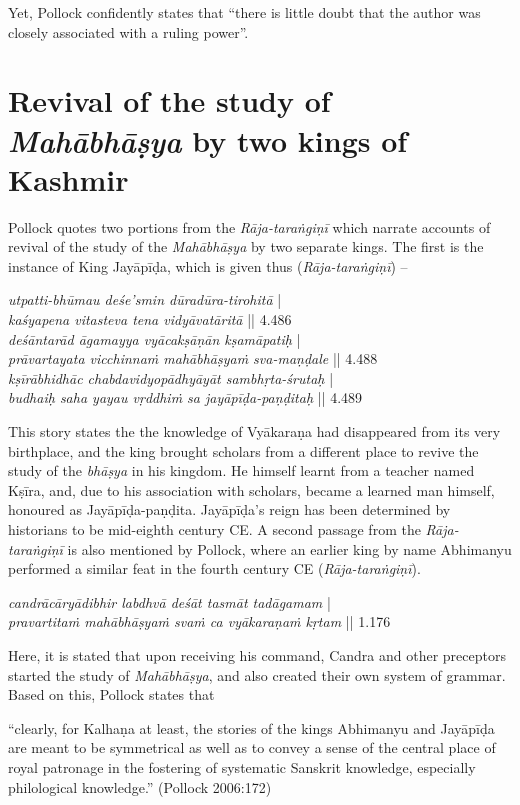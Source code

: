 Yet, Pollock confidently states that ``there is little doubt that the author was closely associated with a ruling power''. 

\section{Revival of the study of {{\sl\bfseries Mahābhāṣya}} by two kings of Kashmir}\label{chap3-sec12}

Pollock quotes two portions from the {\sl Rāja-taraṅgiṇī} which narrate accounts of revival of the study of the {\sl Mahābhāṣya} by two separate kings. The first is the instance of King Jayāpīḍa,  which is given thus ({\sl Rāja-taraṅgiṇī}) --
\begin{myquote}
{{\sl utpatti-bhūmau deśe’smin dūradūra-tirohitā}} |\\[2pt]
{{\sl kaśyapena vitasteva tena vidyāvatāritā}} || 4.486\\[2pt]
{{\sl deśāntarād āgamayya vyācakṣāṇān kṣamāpatiḥ}} |\\[2pt] 
{{\sl prāvartayata vicchinnaṁ mahābhāṣyaṁ sva-maṇḍale}} || 4.488\\[2pt]
{{\sl kṣīrābhidhāc chabdavidyopādhyāyāt sambhṛta-śrutaḥ}} |\\[2pt]
{{\sl budhaiḥ saha yayau vṛddhiṁ sa jayāpīḍa-paṇḍitaḥ}} || 4.489  
\end{myquote}
This story states the the knowledge of Vyākaraṇa had disappeared from its very birthplace, and the king brought scholars from a different place to revive the study of the {\sl bhāṣya} in his kingdom. He himself learnt from a teacher named Kṣīra, and, due to his association with scholars, became a learned man himself, honoured as Jayāpīḍa-paṇḍita. Jayāpīḍa's reign has been determined by historians to be mid-eighth century CE. A second passage from the {\sl Rāja-taraṅgiṇī} is also mentioned by Pollock, where an earlier king by name Abhimanyu performed a similar feat in the fourth century CE ({\sl Rāja-taraṅgiṇī}).
\begin{myquote}
{{\sl candrācāryādibhir labdhvā deśāt tasmāt tadāgamam}} |\\ 
{{\sl pravartitaṁ mahābhāṣyaṁ svaṁ ca vyākaraṇaṁ kṛtam}} || 1.176
\end{myquote}
Here, it is stated that upon receiving his command, Candra and other preceptors started the study of {\sl Mahābhāṣya}, and also created their own system of grammar. Based on this, Pollock states that 
\begin{myquote}
``clearly, for Kalhaṇa  at least, the stories of the kings Abhimanyu and Jayāpīḍa are meant to be symmetrical as well as to convey a sense of the central place of royal patronage in the fostering of systematic Sanskrit knowledge, especially philological knowledge.''
\hfill (Pollock 2006:172)
\end{myquote}
